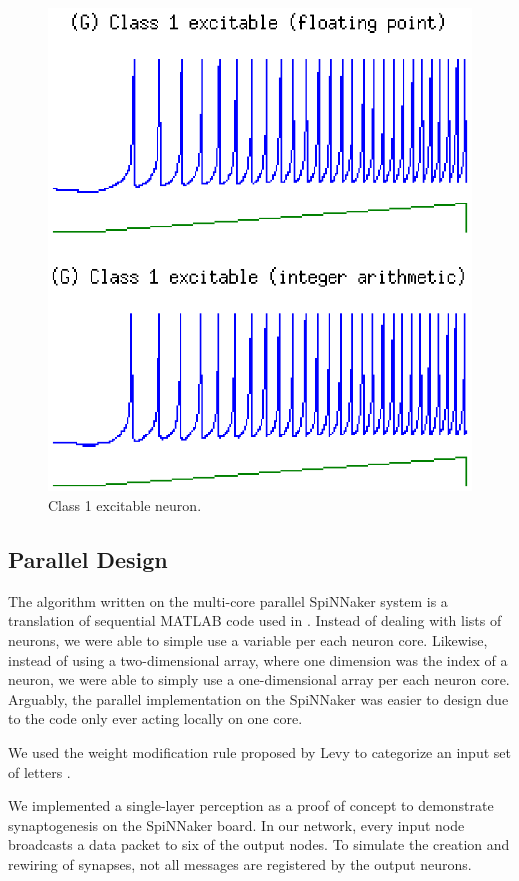 \documentclass[journal]{./sty/IEEEtran}
\begin{document}
\begin{figure}
\centering
\includegraphics[scale=0.6]{imgs/izh_class_1_excitable}
\caption{Class 1 excitable neuron.\label{fig:excit1}}
\end{figure}


\subsection{Parallel Design}
The algorithm written on the multi-core parallel SpiNNaker system is a translation of sequential MATLAB code used in \cite{Polychron:Izhi}.
Instead of dealing with lists of neurons, we were able to simple use a variable per each neuron core.
Likewise, instead of using a two-dimensional array, where one dimension was the index of a neuron, 
we were able to simply use a one-dimensional array per each neuron core.
Arguably, the parallel implementation on the SpiNNaker was easier to design due to the code only ever acting locally on one core.

We used the weight modification rule proposed by Levy to categorize an input set of letters \cite{SynGen:Levy, SynGen2:Levy}.

We implemented a single-layer perception as a proof of concept to demonstrate synaptogenesis on the SpiNNaker board. In our network, every input node broadcasts a data packet to six of the output nodes. To simulate the creation and rewiring of synapses, not all messages are registered by the output neurons. 
\end{document}
